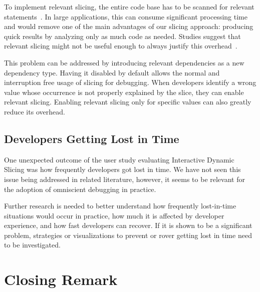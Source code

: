 To implement relevant slicing, the entire code base has to be scanned for relevant statements~\cite{gyimothy99:an_efficient_relevant_slicing}.
In large applications, this can consume significant processing time and would remove one of the main advantages of our slicing approach: producing quick results by analyzing only as much code as needed.
Studies suggest that relevant slicing might not be useful enough to always justify this overhead~\cite{zhang07:a_study_of_effectiveness}.

This problem can be addressed by introducing relevant dependencies as a new dependency type.
Having it disabled by default allows the normal and interruption free usage of slicing for debugging.
When developers identify a wrong value whose occurrence is not properly explained by the slice, they can enable relevant slicing.
Enabling relevant slicing only for specific values can also greatly reduce its overhead.


\subsection{Developers Getting Lost in Time}

One unexpected outcome of the user study evaluating Interactive Dynamic Slicing was how frequently developers got lost in time.
We have not seen this issue being addressed in related literature, however, 
it seems to be relevant for the adoption of omniscient debugging in practice.

Further research is needed to better understand how frequently lost-in-time situations would occur in practice, how much it is affected by developer experience, and how fast developers can recover.
If it is shown to be a significant problem, strategies or visualizations to prevent or rover getting lost in time need to be investigated.

\section{Closing Remark}
\label{sec:closing}



